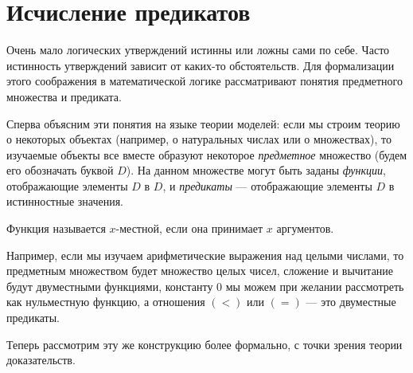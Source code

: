 \section{Исчисление предикатов}

Очень мало логических утверждений истинны или ложны сами по себе.
Часто истинность утверждений зависит от каких-то обстоятельств.
Для формализации этого соображения в математической логике рассматривают
понятия предметного множества и предиката.

Сперва объясним эти понятия на языке теории моделей:
если мы строим теорию о некоторых объектах (например, о натуральных 
числах или о множествах), то изучаемые объекты все вместе образуют 
некоторое \emph{предметное} множество (будем его обозначать буквой $D$). 
На данном множестве могут быть заданы \emph{функции}, отображающие элементы
$D$ в $D$, и \emph{предикаты} --- отображающие элементы $D$ в 
истинностные значения.

\begin{definition}
Функция называется $x$-местной, если она принимает $x$ аргументов.
\end{definition}

Например, если мы изучаем арифметические выражения над целыми числами, 
то предметным множеством будет множество целых чисел, сложение и 
вычитание будут двуместными функциями, константу $0$ мы можем при желании
рассмотреть как нульместную функцию, а отношения $(<)$ или $(=)$ ---
это двуместные предикаты.

Теперь рассмотрим эту же конструкцию более формально, с точки зрения теории 
доказательств.

